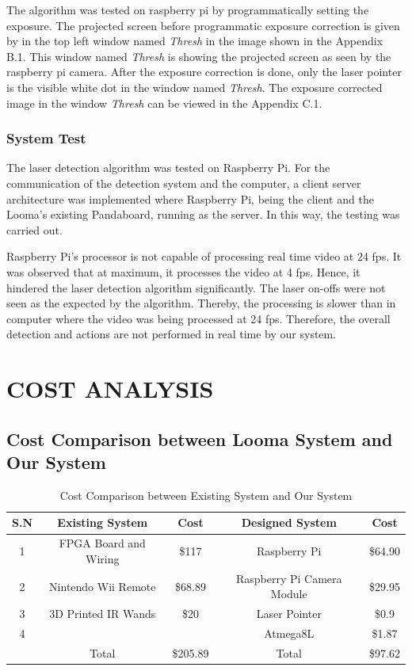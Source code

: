 \documentclass[12pt, a4paper]{article}
\begin{document}
	The algorithm was tested on raspberry pi by programmatically setting the exposure. The projected screen before programmatic exposure correction is given by in the top left window named \emph{Thresh} in the image shown in the Appendix B.1. This window named \emph{Thresh} is showing the projected screen as seen by the raspberry pi camera. After the exposure correction is done, only the laser pointer is the visible white dot in the window named \emph{Thresh}. The exposure corrected image in the window \emph{Thresh} can be viewed in the Appendix C.1.

\subsubsection{System Test}

The laser detection algorithm was tested on Raspberry Pi. For the communication of the detection system and the computer, a client server architecture was implemented where Raspberry Pi, being the client and the Looma’s existing Pandaboard, running as the server. In this way, the testing was carried out.

Raspberry Pi's processor is not capable of processing real time video at 24 fps. It was observed that at maximum, it processes the video at 4 fps. Hence, it hindered the laser detection algorithm significantly. The laser on-offs were not seen as the expected by the algorithm. Thereby, the processing  is slower than in computer where the video was being processed at 24 fps. Therefore, the overall detection and actions are not performed in real time by our system.

\newpage
\section{COST ANALYSIS}
\subsection{Cost Comparison between Looma System and Our System}
\begin{table}[ht]
\begin{tabular}{|c|c|c|c|c|}
\hline
	S.N  & Existing System & Cost & Designed System & Cost\\
\hline
	1 & FPGA Board and Wiring & \$117 & Raspberry Pi & \$64.90\\
\hline
	2 & Nintendo Wii Remote & \$68.89 & Raspberry Pi Camera Module & \$29.95 \\
\hline
	3 & 3D Printed IR Wands & \$20 & Laser Pointer & \$0.9\\
\hline
	4 &  &  & Atmega8L & \$1.87\\
\hline
	 & Total & \$205.89 & Total & \$97.62\\
\hline
\end{tabular}
\caption{Cost Comparison between Existing System and Our System}
\label{tb:sw}
\end{table}
\end{document}
